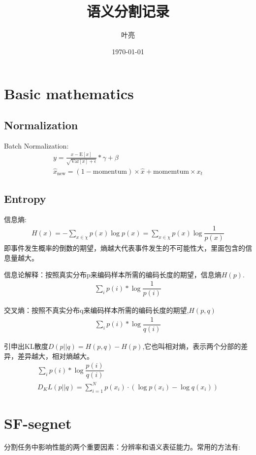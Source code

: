 \documentclass{article}
\title{语义分割记录}
\author{叶亮}
\date{\today}
\begin{document}
 
\maketitle
\tableofcontents
\section{Basic mathematics}
\subsection{Normalization}
Batch Normalization:
\begin{align}
y = \frac{x - \mathrm{E}[x]}{ \sqrt{\mathrm{Var}[x] + \epsilon}} * \gamma + \beta \\
\hat{x}_\text{new} = (1 - \text{momentum}) \times \hat{x} + \text{momemtum} \times x_t
\end{align}

\subsection{Entropy}
信息熵:
\begin{align}
H(x) = -\sum_{x\in\chi}p(x)\log{p(x)} = \sum_{x\in\chi}p(x)\log{\dfrac{1}{{p(x)}}}
\end{align}
即事件发生概率的倒数的期望，熵越大代表事件发生的不可能性大，里面包含的信息量越大。

信息论解释：按照真实分布p来编码样本所需的编码长度的期望，信息熵$H(p)$.
\begin{align}
\sum_{i}p(i) * \log{\dfrac{1}{p(i)}}
\end{align}

交叉熵：按照不真实分布q来编码样本所需的编码长度的期望,$H(p,q)$
\begin{align}
\sum_{i}p(i) * \log{\dfrac{1}{q(i)}}
\end{align}

引申出KL散度$D(p||q) = H(p,q) - H(p)$,它也叫相对熵，表示两个分部的差异，差异越大，相对熵越大。
\begin{align}
\sum_{i}p(i) * \log{\dfrac{p(i)}{q(i)}} \\
D_KL(p||q) = \sum_{i=1}^{N}p(x_i) \cdot ( \log{p(x_i)}-\log{q(x_i)} )
\end{align}



\section{SF-segnet}
分割任务中影响性能的两个重要因素：分辨率和语义表征能力。常用的方法有:
\end{document}
